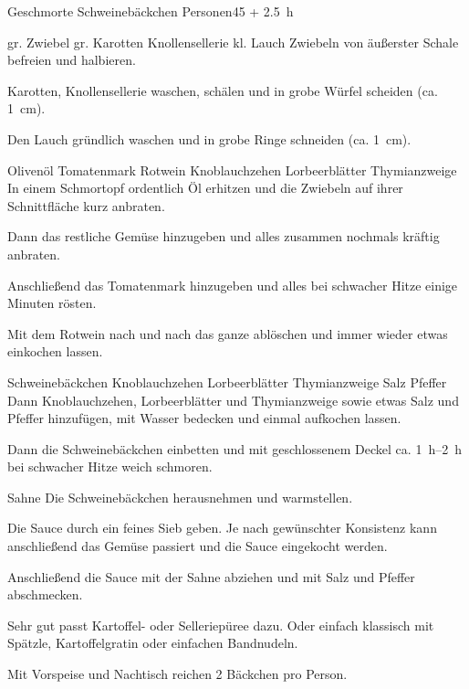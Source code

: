 \begin{MyRecipe}{Geschmorte Schweinebäckchen}{ Personen}{\SI{45}{\minuteprime} + \SI{2,5}{\hour}}
	
	\ingredient[\Calc{1}{\x}]{} {gr. Zwiebel}
	\ingredient[\Calc{2}{\x}]{} {gr. Karotten}
	\ingredient[\Calc{0.5}{\x}]{} {Knollensellerie}
	\ingredient[\Calc{1}{\x}]{} {kl. Lauch}
	Zwiebeln von äußerster Schale befreien und halbieren.
	
	Karotten, Knollensellerie waschen, schälen und in grobe Würfel scheiden (ca. \SI{1}{\centi\meter}).
	
	Den Lauch gründlich waschen und in grobe Ringe schneiden  (ca. \SI{1}{\centi\meter}).\par\bigskip
	
	\ingredient[\Calc{4}{\x}]{\si{\Essloeffel}} {Olivenöl}
	\ingredient[\Calc{40}{\x}]{\si{\gram}} {Tomatenmark}
	\ingredient[\Calc{0.25}{\x}]{\si{\liter}} {Rotwein}
	\ingredient[\Calc{4}{\x}]{} {Knoblauchzehen}
	\ingredient[\Calc{1}{\x}]{} {Lorbeerblätter}
	\ingredient[\Calc{3}{\x}]{} {Thymianzweige}
	In einem Schmortopf ordentlich Öl erhitzen und die Zwiebeln auf ihrer Schnittfläche kurz anbraten. 
	
	Dann das restliche Gemüse hinzugeben und alles zusammen nochmals kräftig anbraten.

	Anschließend das Tomatenmark hinzugeben und alles bei schwacher Hitze einige Minuten rösten. 
	
	Mit dem Rotwein nach und nach das ganze ablöschen und immer wieder etwas einkochen lassen.\par\bigskip
	
	\ingredient[\Calc{12}{\x}]{} {Schweinebäckchen}
	\ingredient[\Calc{4}{\x}]{} {Knoblauchzehen}
	\ingredient[\Calc{1}{\x}]{} {Lorbeerblätter}
	\ingredient[\Calc{3}{\x}]{} {Thymianzweige}
	\ingredient[]{} {Salz}
	\ingredient[]{} {Pfeffer}
	Dann Knoblauchzehen, Lorbeerblätter und Thymianzweige sowie etwas Salz und Pfeffer hinzufügen, mit Wasser bedecken und einmal aufkochen lassen.
	
	Dann die Schweinebäckchen einbetten und mit geschlossenem Deckel ca. \SIrange{1}{2}{\hour} bei schwacher Hitze weich schmoren.\par\bigskip
	
	\ingredient[\Calc{50}{\x}]{\si{\milli\liter}} {Sahne}
	Die Schweinebäckchen herausnehmen und warmstellen.
	
	Die Sauce durch ein feines Sieb geben. Je nach gewünschter Konsistenz kann anschließend das Gemüse passiert und die Sauce eingekocht werden. 
	
	Anschließend die Sauce mit der Sahne abziehen und mit Salz und Pfeffer abschmecken.\par\bigskip
	
	Sehr gut passt Kartoffel- oder Selleriepüree dazu. Oder einfach klassisch mit Spätzle, Kartoffelgratin oder einfachen Bandnudeln.\par\bigskip

	Mit Vorspeise und Nachtisch reichen 2 Bäckchen pro Person.
	
\end{MyRecipe}